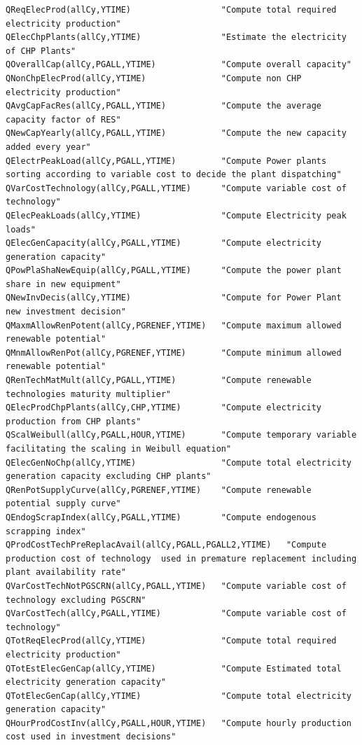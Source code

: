 \documentclass[a4paper,]{scrartcl}
\begin{document}
\begin{lstlisting}
QReqElecProd(allCy,YTIME)                  "Compute total required electricity production"  
QElecChpPlants(allCy,YTIME)                "Estimate the electricity of CHP Plants" 
QOverallCap(allCy,PGALL,YTIME)             "Compute overall capacity"
QNonChpElecProd(allCy,YTIME)               "Compute non CHP electricity production"     
QAvgCapFacRes(allCy,PGALL,YTIME)           "Compute the average capacity factor of RES" 
QNewCapYearly(allCy,PGALL,YTIME)           "Compute the new capacity added every year"  
QElectrPeakLoad(allCy,PGALL,YTIME)         "Compute Power plants sorting according to variable cost to decide the plant dispatching"    
QVarCostTechnology(allCy,PGALL,YTIME)      "Compute variable cost of technology" 
QElecPeakLoads(allCy,YTIME)                "Compute Electricity peak loads" 
QElecGenCapacity(allCy,PGALL,YTIME)        "Compute electricity generation capacity"    
QPowPlaShaNewEquip(allCy,PGALL,YTIME)      "Compute the power plant share in new equipment" 
QNewInvDecis(allCy,YTIME)                  "Compute for Power Plant new investment decision"        
QMaxmAllowRenPotent(allCy,PGRENEF,YTIME)   "Compute maximum allowed renewable potential"
QMnmAllowRenPot(allCy,PGRENEF,YTIME)       "Compute minimum allowed renewable potential" 
QRenTechMatMult(allCy,PGALL,YTIME)         "Compute renewable technologies maturity multiplier" 
QElecProdChpPlants(allCy,CHP,YTIME)        "Compute electricity production from CHP plants"             
QScalWeibull(allCy,PGALL,HOUR,YTIME)       "Compute temporary variable facilitating the scaling in Weibull equation"    
QElecGenNoChp(allCy,YTIME)                 "Compute total electricity generation capacity excluding CHP plants"
QRenPotSupplyCurve(allCy,PGRENEF,YTIME)    "Compute renewable potential supply curve"       
QEndogScrapIndex(allCy,PGALL,YTIME)        "Compute endogenous scrapping index"     
QProdCostTechPreReplacAvail(allCy,PGALL,PGALL2,YTIME)   "Compute production cost of technology  used in premature replacement including plant availability rate"    
QVarCostTechNotPGSCRN(allCy,PGALL,YTIME)   "Compute variable cost of technology excluding PGSCRN"   
QVarCostTech(allCy,PGALL,YTIME)            "Compute variable cost of technology"    
QTotReqElecProd(allCy,YTIME)               "Compute total required electricity production"
QTotEstElecGenCap(allCy,YTIME)             "Compute Estimated total electricity generation capacity"    
QTotElecGenCap(allCy,YTIME)                "Compute total electricity generation capacity"
QHourProdCostInv(allCy,PGALL,HOUR,YTIME)   "Compute hourly production cost used in investment decisions"

\end{lstlisting}
\end{document}
